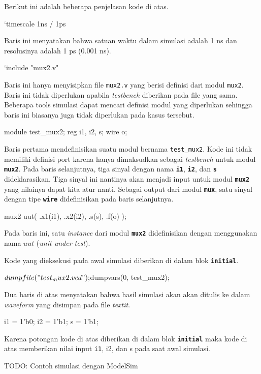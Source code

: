 Berikut ini adalah beberapa penjelasan kode di atas.

\begin{verilogcode}
`timescale 1ns / 1ps
\end{verilogcode}
Baris ini menyatakan bahwa satuan waktu dalam simulasi adalah 1 ns dan
resolusinya adalah 1 ps (0.001 ns).

\begin{verilogcode}
`include "mux2.v"
\end{verilogcode}
Baris ini hanya menyisipkan file {\tt mux2.v} yang berisi definisi dari modul {\tt mux2}.
Baris ini tidak diperlukan apabila \textit{testbench} diberikan pada file yang sama.
Beberapa tools simulasi dapat mencari definisi modul yang diperlukan sehingga
baris ini biasanya juga tidak diperlukan pada kasus tersebut.

\begin{verilogcode}
module test_mux2;
  reg i1, i2, s;
  wire o;
\end{verilogcode}

Baris pertama mendefinisikan suatu modul bernama {\tt\small test\_mux2}. Kode
ini tidak memiliki definisi port karena hanya dimaksudkan sebagai {\it testbench}
untuk modul {\tt\textbf{mux2}}. Pada baris selanjutnya,
tiga sinyal dengan nama {\tt\textbf{i1}}, {\tt\textbf{i2}},
dan {\tt\textbf{s}} dideklarasikan. Tiga sinyal ini nantinya akan menjadi input untuk
modul {\tt\textbf{mux2}}
yang nilainya dapat kita atur nanti.
Sebagai output dari modul {\tt\textbf{mux}}, satu sinyal dengan tipe {\tt\textbf{wire}}
didefinisikan pada baris selanjutnya.

\begin{verilogcode}
  mux2 uut( .x1(i1), .x2(i2), .s(s), .f(o) );
\end{verilogcode}

Pada baris ini, satu \textit{instance} dari modul {\tt\textbf{mux2}} didefinisikan
dengan menggunakan nama $uut$ (\textit{unit under test}).

Kode yang dieksekusi pada awal simulasi diberikan di dalam blok
{\tt\textbf{initial}}.

\begin{verilogcode}
  $dumpfile("test_mux2.vcd");
  $dumpvars(0, test_mux2);
\end{verilogcode}

Dua baris di atas menyatakan bahwa hasil simulasi akan akan ditulis
ke dalam \textit{waveform} yang disimpan pada file \textit{textit}.

\begin{verilogcode}
i1 = 1'b0;
i2 = 1'b1;
s  = 1'b1;
\end{verilogcode}

Karena potongan kode di atas diberikan di dalam blok {\tt\textbf{initial}}
maka kode di atas memberikan nilai input {\tt i1}, i2, dan s pada saat awal
simulasi.

{\color{red} TODO: Contoh simulasi dengan ModelSim}


